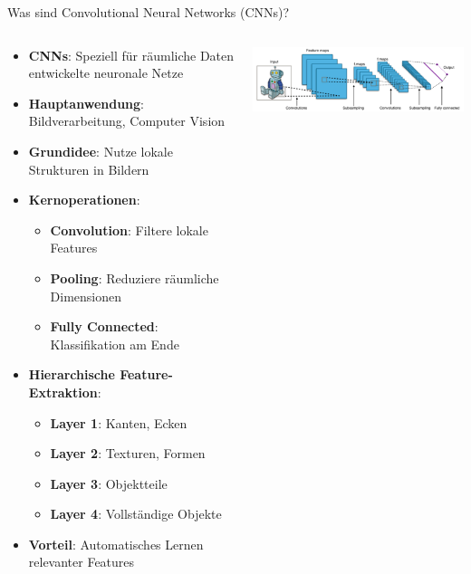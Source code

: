 \documentclass[aspectratio=1610, xcolor=dvipsnames, 9pt]{beamer}
\begin{document}
      \begin{frame}{Was sind Convolutional Neural Networks (CNNs)?}
        \begin{columns}
          \begin{column}{0.65\textwidth}
            \begin{itemize}
              \item \textbf{CNNs}: Speziell für räumliche Daten entwickelte neuronale Netze
              \item \textbf{Hauptanwendung}: Bildverarbeitung, Computer Vision
              \item \textbf{Grundidee}: Nutze lokale Strukturen in Bildern
              \item \textbf{Kernoperationen}:
              \begin{itemize}
                \item \textbf{Convolution}: Filtere lokale Features
                \item \textbf{Pooling}: Reduziere räumliche Dimensionen
                \item \textbf{Fully Connected}: Klassifikation am Ende
              \end{itemize}
              \item \textbf{Hierarchische Feature-Extraktion}:
              \begin{itemize}
                \item \textbf{Layer 1}: Kanten, Ecken
                \item \textbf{Layer 2}: Texturen, Formen
                \item \textbf{Layer 3}: Objektteile
                \item \textbf{Layer 4}: Vollständige Objekte
              \end{itemize}
              \item \textbf{Vorteil}: Automatisches Lernen relevanter Features
            \end{itemize}
          \end{column}
          \begin{column}{0.35\textwidth}
            \centering
            \includegraphics[width=\textwidth]{images/CNN.png}

\end{column}
\end{columns}
\end{frame}
\end{document}
